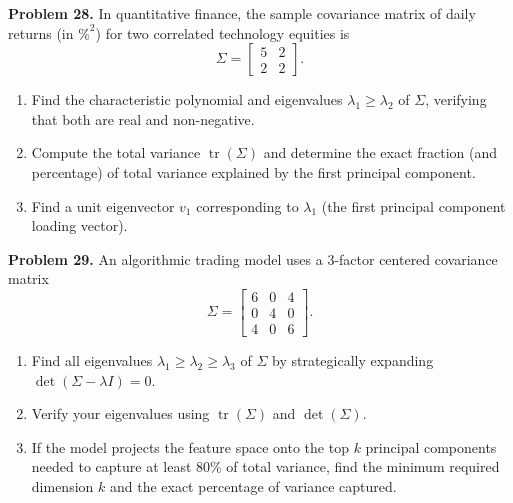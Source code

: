\documentclass[11pt, letterpaper]{article}
\theoremstyle{definition}
\theoremstyle{remark}
\begin{document}
\noindent\textbf{Problem 28.} In quantitative finance, the sample covariance matrix of daily returns (in $\%^2$) for two correlated technology equities is
\[
\Sigma = \begin{bmatrix} 5 & 2 \\ 2 & 2 \end{bmatrix}.
\]
\begin{enumerate}[label=(\alph*), topsep=3pt, itemsep=3pt]
    \item Find the characteristic polynomial and eigenvalues $\lambda_1 \ge \lambda_2$ of $\Sigma$, verifying that both are real and non-negative.
    \item Compute the total variance $\operatorname{tr}(\Sigma)$ and determine the exact fraction (and percentage) of total variance explained by the first principal component.
    \item Find a unit eigenvector $v_1$ corresponding to $\lambda_1$ (the first principal component loading vector).
\end{enumerate}

\noindent\textbf{Problem 29.} An algorithmic trading model uses a $3$-factor centered covariance matrix
\[
\Sigma = \begin{bmatrix} 6 & 0 & 4 \\ 0 & 4 & 0 \\ 4 & 0 & 6 \end{bmatrix}.
\]
\begin{enumerate}[label=(\alph*), topsep=3pt, itemsep=3pt]
    \item Find all eigenvalues $\lambda_1 \ge \lambda_2 \ge \lambda_3$ of $\Sigma$ by strategically expanding $\det(\Sigma - \lambda I) = 0$.
    \item Verify your eigenvalues using $\operatorname{tr}(\Sigma)$ and $\det(\Sigma)$.
    \item If the model projects the feature space onto the top $k$ principal components needed to capture at least $80\%$ of total variance, find the minimum required dimension $k$ and the exact percentage of variance captured.
\end{enumerate}
\end{document}

